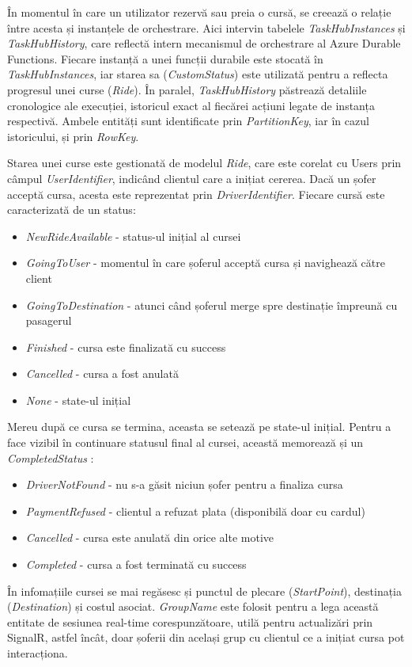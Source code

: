 În momentul în care un utilizator rezervă sau preia o cursă, se creează o relație între acesta și instanțele de orchestrare.
Aici intervin tabelele \textit{TaskHubInstances} și \textit{TaskHubHistory}, care reflectă intern mecanismul
de orchestrare al Azure Durable Functions. Fiecare instanță a unei funcții durabile este stocată în \textit{TaskHubInstances}, iar starea
sa (\textit{CustomStatus}) este utilizată pentru a reflecta progresul unei curse (\textit{Ride}). În paralel, \textit{TaskHubHistory} păstrează detaliile cronologice ale
execuției, istoricul exact al fiecărei acțiuni legate de instanța respectivă. Ambele entități sunt identificate prin \textit{PartitionKey}, iar
în cazul istoricului, și prin \textit{RowKey}.

Starea unei curse este gestionată de modelul \textit{Ride}, care este corelat cu Users prin câmpul \textit{UserIdentifier}, indicând clientul
care a inițiat cererea. Dacă un șofer acceptă cursa, acesta este reprezentat prin \textit{DriverIdentifier}. Fiecare cursă este
caracterizată de un status:
\begin{itemize}
    \item \textit{NewRideAvailable} - status-ul inițial al cursei
    \item \textit{GoingToUser} - momentul în care șoferul acceptă cursa și navighează către client
    \item \textit{GoingToDestination} - atunci când șoferul merge spre destinație împreună cu pasagerul
    \item \textit{Finished} - cursa este finalizată cu success
    \item \textit{Cancelled} - cursa a fost anulată
    \item \textit{None} - state-ul inițial
\end{itemize}
Mereu după ce cursa se termina, aceasta se setează pe state-ul inițial.
Pentru a face vizibil în continuare statusul final al cursei, această memorează și un \textit{CompletedStatus} :
\begin{itemize}
    \item \textit{DriverNotFound} - nu s-a găsit niciun șofer pentru a finaliza cursa
    \item \textit{PaymentRefused} - clientul a refuzat plata (disponibilă doar cu cardul)
    \item \textit{Cancelled} - cursa este anulată din orice alte motive
    \item \textit{Completed} - cursa a fost terminată cu success
\end{itemize}
În infomațiile cursei se mai regăsesc și punctul de plecare (\textit{StartPoint}),
destinația (\textit{Destination}) și costul asociat. \textit{GroupName} este folosit pentru a lega această entitate de sesiunea real-time
corespunzătoare, utilă pentru actualizări prin SignalR, astfel încât, doar șoferii din același grup cu clientul ce a inițiat cursa pot interacționa.



